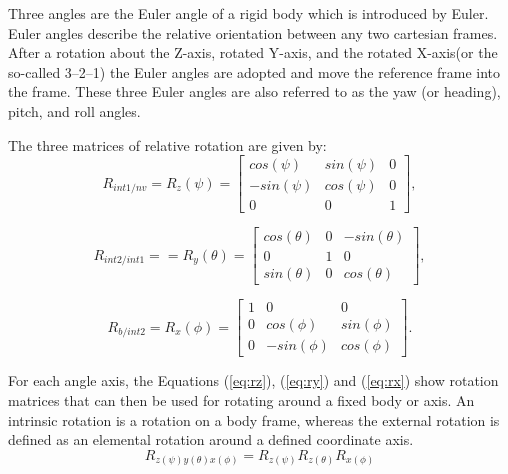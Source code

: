 Three angles are the Euler angle of a rigid body which is introduced by Euler. Euler angles describe the relative orientation between any two cartesian frames. After a rotation about the Z-axis, rotated Y-axis, and the rotated X-axis(or the so-called 3–2–1) the Euler angles are adopted and move the reference frame into the frame. These three Euler angles are also referred to as the yaw (or heading), pitch, and roll angles\cite{cai_coordinate_2011}.

The three matrices of relative rotation are given by:
\begin{equation}
  R_{int1/nv} = R_{z}(\psi) = \begin{bmatrix}
cos(\psi) & sin(\psi) & 0\\ 
-sin(\psi) & cos(\psi) & 0 \\ 
0 & 0 & 1
\end{bmatrix},
\end{equation}\label{eq:rz}

\begin{equation}
  R_{int2/int1} = = R_{y}(\theta) = \begin{bmatrix}
cos(\theta) & 0 & -sin(\theta)\\ 
0 & 1 & 0 \\
sin(\theta) & 0 & cos(\theta)
\end{bmatrix},
\end{equation}\label{eq:ry}

\begin{equation}
  R_{b/int2} = R_{x}(\phi) =\begin{bmatrix}
1 & 0 & 0\\ 
0 & cos(\phi) & sin(\phi) \\ 
0 & -sin(\phi) & cos(\phi)
\end{bmatrix}.
\end{equation}\label{eq:rx}


For each angle axis, the Equations (\ref{eq:rz}), (\ref{eq:ry}) and (\ref{eq:rx}) show rotation matrices that can then be used for rotating around a fixed body or axis. An intrinsic rotation is a rotation on a body frame, whereas the external rotation is defined as an elemental rotation around a defined coordinate axis.
\begin{equation}
  R_{z(\psi)y(\theta)x(\phi)} = R_{z(\psi)} R_{z(\theta)}R_{x(\phi)}
\end{equation}


